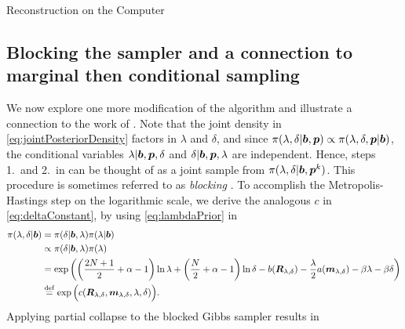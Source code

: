 \begin{chapter}{Reconstruction on the Computer}
\subsection{Blocking the sampler and a connection to marginal then conditional sampling}

We now explore one more modification of the algorithm and illustrate a connection to the work of \citep{fox2015fast}.
Note that the joint density in \eqref{eq:jointPosteriorDensity} factors in $\lambda$ and $\delta$, and since $\pi(\lambda,\delta|\mbox{\boldmath$b$},\mbox{\boldmath$p$}) \propto \pi(\lambda,\delta,\mbox{\boldmath$p$}|\mbox{\boldmath$b$})$, the conditional variables $\lambda|\mbox{\boldmath$b$}, \mbox{\boldmath$p$},\delta$ and $\delta|\mbox{\boldmath$b$},\mbox{\boldmath$p$},\lambda$ are independent.
Hence, steps 1.~and 2.~in  can be thought of as a joint sample from $\pi(\lambda,\delta|\mbox{\boldmath$b$},\mbox{\boldmath$p$}^k)$.
This procedure is sometimes referred to as \emph{blocking} \citep{liu2008monte}.
To accomplish the Metropolis-Hastings step on the logarithmic scale, we derive the analogous $c$ in \eqref{eq:deltaConstant}, by using \eqref{eq:lambdaPrior} in
\begin{align}
  \pi(\lambda,\delta|\mbox{\boldmath$b$}) 
    &=\pi(\delta|\mbox{\boldmath$b$},\lambda)\pi(\lambda|\mbox{\boldmath$b$}) \nonumber\\
    &\propto \pi(\delta|\mbox{\boldmath$b$},\lambda)\pi(\lambda) \nonumber\\
    &= \exp\left( \left(\frac {2N+1}2 +\alpha - 1\right)\ln\lambda + \left(\frac N2 +\alpha - 1\right)\ln\delta - b(\mbox{\boldmath$R$}_{\lambda,\delta}) -\frac \lambda 2 a(\mbox{\boldmath$m$}_{\lambda,\delta}) -\beta\lambda -\beta\delta  \right)\nonumber \\
    &\stackrel{\rm def}{=} \exp\Big(c(\mbox{\boldmath$R$}_{\lambda,\delta},\mbox{\boldmath$m$}_{\lambda,\delta},\lambda,\delta)\Big). \label{eq:jointConstant}
\end{align}
Applying partial collapse to the blocked Gibbs sampler results in 


\end{chapter}
